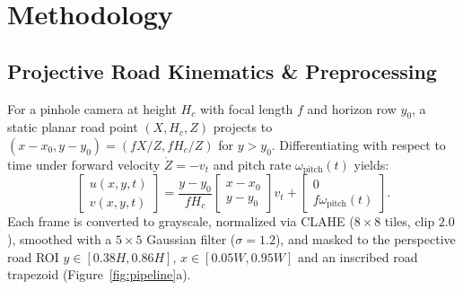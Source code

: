 \documentclass[10pt,twocolumn]{article}
\begin{document}
\begin{table}[t!]
\centering
\caption{Quantification of Temporal Data Leakage (Raw Ridge $\ell_2$).}
\label{tab:leakage}
\footnotesize
{}
\end{table}

\section{Methodology}
\subsection{Projective Road Kinematics \& Preprocessing}
For a pinhole camera at height $H_c$ with focal length $f$ and horizon row $y_0$, a static planar road point $(X, H_c, Z)$ projects to $(x - x_0, y - y_0) = (f X/Z, f H_c/Z)$ for $y > y_0$. Differentiating with respect to time under forward velocity $\dot{Z} = -v_t$ and pitch rate $\omega_{\text{pitch}}(t)$ yields:
{\small
\begin{equation}
\begin{bmatrix} u(x,y,t) \\ v(x,y,t) \end{bmatrix} = \frac{y - y_0}{f H_c} \begin{bmatrix} x - x_0 \\ y - y_0 \end{bmatrix} v_t + \begin{bmatrix} 0 \\ f \omega_{\text{pitch}}(t) \end{bmatrix}. \label{eq:kinematics}
\end{equation}%
}
Each frame is converted to grayscale, normalized via CLAHE ($8 \times 8$ tiles, clip $2.0$), smoothed with a $5 \times 5$ Gaussian filter ($\sigma = 1.2$), and masked to the perspective road ROI $y \in [0.38H, 0.86H]$, $x \in [0.05W, 0.95W]$ and an inscribed road trapezoid (Figure~\ref{fig:pipeline}a).
\end{document}
